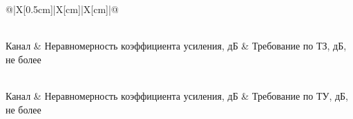\begingroup
	\centering
	\setcounter{rowcount}{0}
	\setcounter{colcount}{0}
	\small
	\renewcommand{\arraystretch}{1.5}
	\begin{longtabu}{@{}|X[0.5cm]|X[cm]|X[cm]|@{}}
	\captionsetup{labelformat=default}	
	\caption{ }\label{t:characteristics}\\
	\hline
	Канал & Неравномерность коэффициента усиления, дБ & Требование по ТЗ, дБ, не более \\ \hline
	\endfirsthead
	\captionsetup{labelformat=continued,skip=3pt}
	\caption[]{ }\\
	\hline
	Канал & Неравномерность коэффициента усиления, дБ & Требование по ТУ, дБ, не более \\ \hline
	\endhead
	\csvreader[no head,table head=\hline,late after line=\\ \hline]{\file}{}{\thecsvrow & \csvcoli &\flatness}%
	\end{longtabu}
\endgroup
